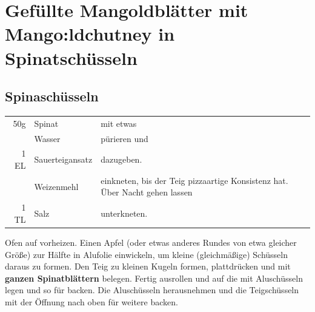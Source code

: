 \section{Gefüllte Mangoldblätter mit Mango:ldchutney in Spinatschüsseln}
\subsection*{Spinaschüsseln}\label{subsec:spinach-bowls}
\begin{longtable}{rlL{17.1cm}}
    50g     &   Spinat          &   mit etwas   \\
            &   Wasser          &   pürieren und    \\
    1 EL    &   Sauerteigansatz &   dazugeben.  \\
            &   Weizenmehl      &   einkneten, bis der Teig pizzaartige Konsistenz hat.
                                    Über Nacht gehen lassen   \\
    1 TL    &   Salz            &   unterkneten.    \\
\end{longtable}
Ofen auf  vorheizen.
Einen Apfel (oder etwas anderes Rundes von etwa gleicher Größe) zur Hälfte in Alufolie einwickeln, um kleine (gleichmäßige) Schüsseln daraus zu formen.
Den Teig zu kleinen Kugeln formen, plattdrücken und mit \textbf{ganzen Spinatblättern} belegen.
Fertig ausrollen und auf die mit Aluschüsseln legen und so für  backen.
Die Aluschüsseln herausnehmen und die Teigschüsseln mit der Öffnung nach oben für weitere  backen.

